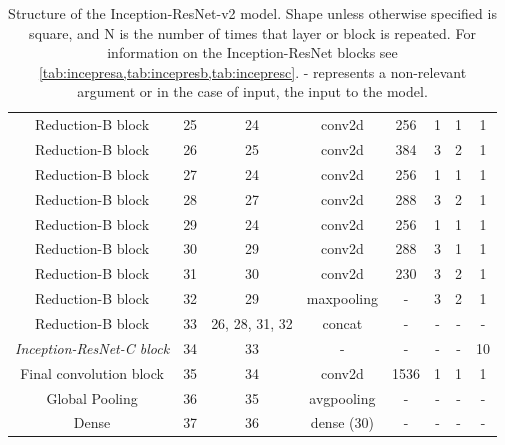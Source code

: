 \documentclass[12pt]{article}
\numberwithin{equation}{section}
\numberwithin{figure}{section}
\begin{document}
\begin{table}[H]
{\begin{tabular}{c|c|c|c|c|c|c|c}
	Reduction-B block                 & 25               & 24             & conv2d            & 256              & 1              & 1                      & 1          \\
	Reduction-B block                 & 26               & 25             & conv2d            & 384              & 3              & 2                      & 1          \\
	Reduction-B block                 & 27               & 24             & conv2d            & 256              & 1              & 1                      & 1          \\
	Reduction-B block                 & 28               & 27             & conv2d            & 288              & 3              & 2                      & 1          \\
	Reduction-B block                 & 29               & 24             & conv2d            & 256              & 1              & 1                      & 1          \\
	Reduction-B block                 & 30               & 29             & conv2d            & 288              & 3              & 1                      & 1          \\
	Reduction-B block                 & 31               & 30             & conv2d            & 230              & 3              & 2                      & 1          \\
	Reduction-B block                 & 32               & 29             & maxpooling        & -                & 3              & 2                      & 1          \\
	Reduction-B block                 & 33               & 26, 28, 31, 32 & concat            & -                & -              & -                      & -          \\\hdashline
	\textit{Inception-ResNet-C block} & 34               & 33             & -                 & -                & -              & -                      & 10         \\\hdashline
	Final convolution block           & 35               & 34             & conv2d            & 1536             & 1              & 1                      & 1          \\
	Global Pooling                    & 36               & 35             & avgpooling        & -                & -              & -                      & -          \\
	Dense                             & 37               & 36             & dense (30)        & -                & -              & - 				& -          \\ \hline
	\end{tabular}%
	}
	\caption{Structure of the Inception-ResNet-v2 model. Shape unless otherwise specified is square, and N is the number of times that layer or block is repeated. For information on the Inception-ResNet blocks see \cref{tab:incepresa,tab:incepresb,tab:incepresc}.  - represents a non-relevant argument or in the case of input, the input to the model.}
	\label{tab:incepresfull}
	\end{table}
\end{document}
